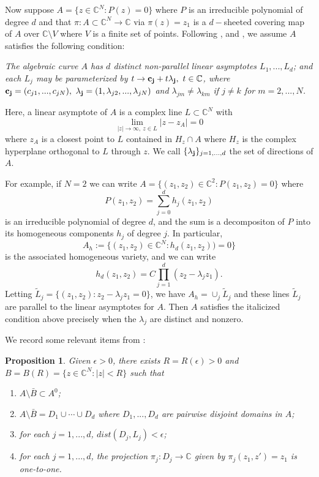 \documentclass[12pt]{article}
\numberwithin{equation}{section}
\newtheorem{proposition}[theorem]{Proposition}
\newcommand{\C}{\mathbb{C}}
\renewcommand{\tilde}{\widetilde}
\begin{document}
Now 
suppose $A=\{z\in \C^N:P(z)=0\}$ where $P$ is an irreducible polynomial of degree $d$ and that $\pi:A\subset \C^N \to \C$ via $\pi(z)=z_1$ is a $d-$sheeted covering map of $A$ over $\C\setminus V$ where $V$ is a finite set of points. Following \cite{BM}, \cite{HM} and \cite{M}, we assume $A$ satisfies the following condition:

{\it The algebraic curve $A$ has $d$ distinct non-parallel linear asymptotes $L_1,...,L_d$; and each $L_j$ may be parameterized by $t\to {\bf c_j}+t{\bf \lambda_j}, \ t\in \C$, where 
${\bf c_j}=(c_{j1},...,c_{jN}), \ {\bf \lambda_j}=(1,\lambda_{j2},...,\lambda_{jN})$ and $\lambda_{jm}\ne \lambda_{km}$ if $j\not = k$ for $m=2,...,N$.}

\noindent Here, a linear asymptote of $A$ is a complex line $L\subset \C^N$ with 
$$\lim_{|z|\to \infty, \ z\in L} |z-z_A|=0$$
where $z_A$ is a closest point to $L$ contained in $H_z\cap A$ where $H_z$ is the complex hyperplane orthogonal to $L$ through $z$. We call $\{{\bf \lambda_j}\}_{j=1,...,d}$ the set of directions of $A$.

For example, if $N=2$ we can write $A=\{(z_1,z_2) \in \C^2: P(z_1,z_2)=0\}$ where 
$$P(z_1,z_2)=\sum_{j=0}^d h_j(z_1,z_2)$$
is an irreducible polynomial of degree $d$, and the sum is a decompositon of $P$ into its homogeneous components $h_j$ of degree $j$. In particular,
$$A_h :=\{(z_1,z_2)\in \C^N: h_d(z_1,z_2))=0\}$$
is the associated homogeneous variety, and we can write
$$h_d(z_1,z_2)=C\prod_{j=1}^d (z_2 - \lambda_j z_1).$$
Letting $\tilde L_j =\{(z_1,z_2):z_2 - \lambda_j z_1=0\}$, we have 
$A_h=\cup_j \tilde L_j$ and these lines $\tilde L_j$ are parallel to the linear asymptotes for $A$. Then $A$ satisfies the italicized condition above precisely when the $\lambda_j$ are distinct and nonzero.

We record some relevant items from \cite{HM}:

\begin{proposition} \label{hmstuff} Given $\epsilon >0$, there exists $R=R(\epsilon)>0$ and $B=B(R)=\{z\in \C^N: |z|<R\}$ such that
\begin{enumerate}
\item $A\setminus \bar B\subset A^0$;
\item $A\setminus \bar B=D_1\cup \cdots \cup D_d$ where $D_1,...,D_d$ are pairwise disjoint domains in $A$;
\item for each $j=1,...,d$, $dist(D_j,L_j)< \epsilon$; 
\item for each $j=1,...,d$, the projection $\pi_j: D_j \to \C$ given by $\pi_j(z_1,z')=z_1$ is one-to-one.

\end{enumerate}


\end{proposition}
\end{document}
